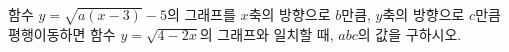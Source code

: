 함수 $y=\sqrt{a(x-3)}-5$의 그래프를 $x$축의 방향으로 $b$만큼, $y$축의 방향으로 $c$만큼 평행이동하면 함수 $y=\sqrt{4-2x}$의 그래프와 일치할 때, $abc$의 값을 구하시오. 
